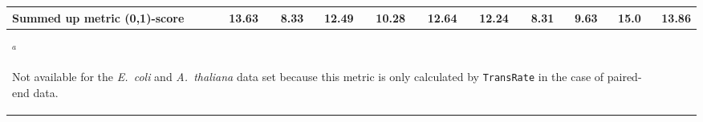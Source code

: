 \documentclass{scrartcl}
\begin{document}
\begin{landscape}
\begin{table}
\begin{scriptsize}
\begin{tabular}{llllllllllll}
\multicolumn{2}{l}{\textbf{Summed up metric (0,1)-score}}&13.63&8.33&12.49&10.28&12.64&12.24&8.31&9.63&15.0&13.86\\\bottomrule
\multicolumn{11}{l}{$^{a}$\begin{scriptsize}Not available for the \emph{E.~coli} and \emph{A.~thaliana} data set because this metric is only calculated by \texttt{TransRate} in the case of paired-end data.\end{scriptsize}}\\\end{tabular}\end{scriptsize}
\end{table}
\end{landscape}
\end{document}
